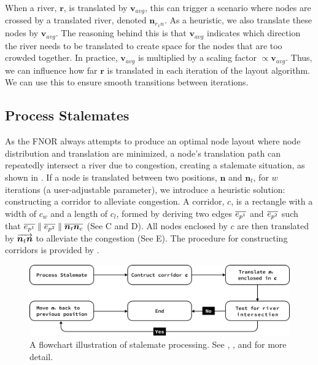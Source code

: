 \documentclass[Afour,sagev,times]{sagej}
\newcommand{\Vector}[1]{\protect\overrightarrow{#1}}
\newcommand{\Line}[1]{\protect\overline{#1}}
\newcommand{\stalemateMax}{w}
\newcommand{\node}{\bm{n}}
\newcommand{\nodeFNOR}{\node_t}
\newcommand{\nodeVectorTC}{\Vector{\nodeFNOR\node}}
\newcommand{\river}{\bm{r}}
\newcommand{\Corridor}{c}
\newcommand{\CorridorLength}{\Corridor_l}
\newcommand{\CorridorWidth}{\Corridor_w}
\newcommand{\PointP}{\node_c}
\newcommand{\EdgeParallelA}{\Line{e_{p^1}}}
\newcommand{\EdgeParallelB}{\Line{e_{p^2}}}
\newcommand{\nodeLineNtNc}{\Line{\nodeFNOR\PointP}}
\newcommand{\vectorAvg}{\bm{v}_{avg}}
\newcommand{\RxN}{\node_{r_{x}n}}
\begin{document}
When a river, $ \river $, is translated by $ \vectorAvg $, this can trigger a scenario where nodes are crossed by a translated river, denoted $ \RxN $. As a heuristic, we also translate these nodes by $ \vectorAvg $. The reasoning behind this is that $ \vectorAvg $ indicates which direction the river needs to be translated to create space for the nodes that are too crowded together. In practice, $ \vectorAvg $ is multiplied by a scaling factor $ \propto\vectorAvg $. Thus, we can influence how far $ \river $ is translated in each iteration of the layout algorithm. We can use this to ensure smooth transitions between iterations.

\subsection{Process Stalemates}
\label{subsec:{Process Stalemates}}

As the FNOR always attempts to produce an optimal node layout where node distribution and translation are minimized, a node's translation path can repeatedly intersect a river due to congestion, creating a stalemate situation, as shown in . If a node is translated between two positions, $ \node $ and $ \nodeFNOR $, for $ \stalemateMax $ iterations (a user-adjustable parameter), we introduce a heuristic solution: constructing a corridor to alleviate congestion. A corridor, $ \Corridor $, is a rectangle with a width of $ \CorridorWidth $ and a length of $ \CorridorLength $, formed by deriving two edges $ \EdgeParallelA $ and $ \EdgeParallelB $ such that $ \EdgeParallelA \parallel \EdgeParallelB \parallel \nodeLineNtNc $ (See C and D). All nodes enclosed by $ \Corridor $ are then translated by $ \nodeVectorTC $ to alleviate the congestion (See E). The procedure for constructing corridors is provided by .

{
    \begin{figure}[tb!]
        \centering
        \includegraphics[width=\columnwidth,keepaspectratio]{flowchart stalemate.png}
        \caption{A flowchart illustration of stalemate processing. See , , and  for more detail.}
        \label{fig:flowchart-stalemate}
    \end{figure}
   }
\end{document}
